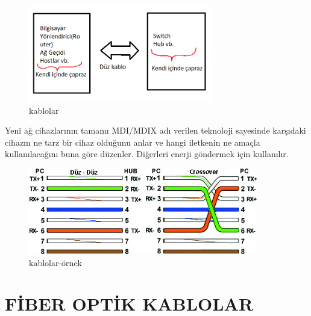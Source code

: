 \begin{figure}[ht]
    \centering
    \includegraphics[width=8cm]{images/caprazduzz}
    \caption{kablolar}
    \label{fig:caprazduz_kablo}
\end{figure}

Yeni ağ cihazlarının tamamı MDI/MDIX adı verilen teknoloji sayesinde karşıdaki cihazın ne tarz bir cihaz olduğunu anlar ve hangi iletkenin ne amaçla kullanılacağını buna göre  düzenler. Diğerleri enerji göndermek için kullanılır.

\begin{figure}[ht]
    \centering
    \includegraphics[width=10cm]{images/ethcable}
    \caption{kablolar-örnek}
    \label{fig:caprazduz_kablo_ornek_gosterim}
\end{figure}

\section*{FİBER OPTİK KABLOLAR}


